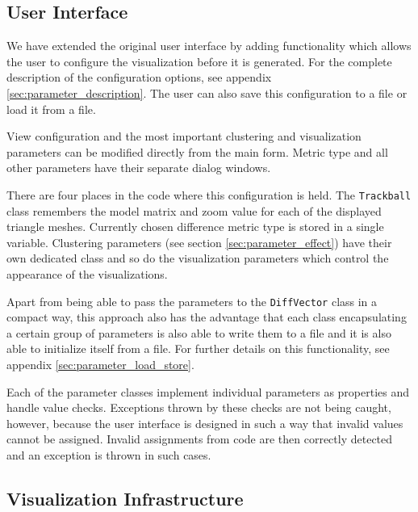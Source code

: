\subsection{User Interface}

We have extended the original user interface by adding functionality which allows the user to configure the visualization before it is generated. For the complete description of the configuration options, see appendix \ref{sec:parameter_description}. The user can also save this configuration to a file or load it from a file.

View configuration and the most important clustering and visualization parameters can be modified directly from the main form. Metric type and all other parameters have their separate dialog windows.

There are four places in the code where this configuration is held. The \verb+Trackball+ class remembers the model matrix and zoom value for each of the displayed triangle meshes. Currently chosen difference metric type is stored in a single variable. Clustering parameters (see section \ref{sec:parameter_effect}) have their own dedicated class and so do the visualization parameters which control the appearance of the visualizations.

Apart from being able to pass the parameters to the \verb+DiffVector+ class in a compact way, this approach also has the advantage that each class encapsulating a certain group of parameters is also able to write them to a file and it is also able to initialize itself from a file\footnotemark. For further details on this functionality, see appendix \ref{sec:parameter_load_store}.


Each of the parameter classes implement individual parameters as properties and handle value checks. Exceptions thrown by these checks are not being caught, however, because the user interface is designed in such a way that invalid values cannot be assigned. Invalid assignments from code are then correctly detected and an exception is thrown in such cases.
\subsection{Visualization Infrastructure}

